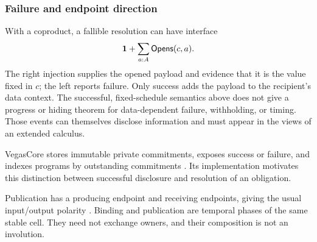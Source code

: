 \subsubsection{Failure and endpoint direction}

With a coproduct, a fallible resolution can have interface
\begin{equation}
 \mathbf 1+\sum_{a:A}\mathsf{Opens}(c,a).
 \label{dep:eq:26}
\end{equation}
The right injection supplies the opened payload and evidence that it is the
value fixed in $c$; the left reports failure. Only success adds the payload
to the recipient's data context. The successful, fixed-schedule semantics
above does not give a progress or hiding theorem for data-dependent failure,
withholding, or timing. Those events can themselves disclose information and
must appear in the views of an extended calculus.

VegasCore stores immutable private commitments, exposes success or failure,
and indexes programs by outstanding commitments
\cite{VegasCore2026}. Its implementation motivates this distinction between
successful disclosure and resolution of an obligation.

Publication has a producing endpoint and receiving endpoints, giving the
usual input/output polarity \cite{Griffith2016}. Binding and publication
are temporal phases of the same stable cell. They need not exchange owners,
and their composition is not an involution.
